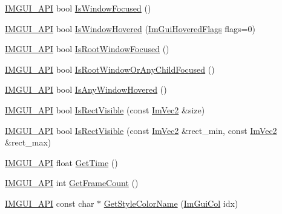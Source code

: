 \begin{DoxyCompactItemize}
\item 
\mbox{\hyperlink{imgui_8h_a43829975e84e45d1149597467a14bbf5}{I\+M\+G\+U\+I\+\_\+\+A\+PI}} bool \mbox{\hyperlink{namespace_im_gui_a1bc0d66039324e071c7d1ae20f9b1211}{Is\+Window\+Focused}} ()
\item 
\mbox{\hyperlink{imgui_8h_a43829975e84e45d1149597467a14bbf5}{I\+M\+G\+U\+I\+\_\+\+A\+PI}} bool \mbox{\hyperlink{namespace_im_gui_aaed1ebf40cc2cb2ec30b0ba39b91d4a5}{Is\+Window\+Hovered}} (\mbox{\hyperlink{imgui_8h_a3a8f688665e5ea0bd9700e1251580a2c}{Im\+Gui\+Hovered\+Flags}} flags=0)
\item 
\mbox{\hyperlink{imgui_8h_a43829975e84e45d1149597467a14bbf5}{I\+M\+G\+U\+I\+\_\+\+A\+PI}} bool \mbox{\hyperlink{namespace_im_gui_abf8f15c7648d453142b0dc72bc5ed8ba}{Is\+Root\+Window\+Focused}} ()
\item 
\mbox{\hyperlink{imgui_8h_a43829975e84e45d1149597467a14bbf5}{I\+M\+G\+U\+I\+\_\+\+A\+PI}} bool \mbox{\hyperlink{namespace_im_gui_ad7175b87a80da527fb5ba5bc75993091}{Is\+Root\+Window\+Or\+Any\+Child\+Focused}} ()
\item 
\mbox{\hyperlink{imgui_8h_a43829975e84e45d1149597467a14bbf5}{I\+M\+G\+U\+I\+\_\+\+A\+PI}} bool \mbox{\hyperlink{namespace_im_gui_a62379e94283e247288c9a6c15a2b797e}{Is\+Any\+Window\+Hovered}} ()
\item 
\mbox{\hyperlink{imgui_8h_a43829975e84e45d1149597467a14bbf5}{I\+M\+G\+U\+I\+\_\+\+A\+PI}} bool \mbox{\hyperlink{namespace_im_gui_a578ead6237b3ed05497ed361f18d9f97}{Is\+Rect\+Visible}} (const \mbox{\hyperlink{struct_im_vec2}{Im\+Vec2}} \&size)
\item 
\mbox{\hyperlink{imgui_8h_a43829975e84e45d1149597467a14bbf5}{I\+M\+G\+U\+I\+\_\+\+A\+PI}} bool \mbox{\hyperlink{namespace_im_gui_a5aca7e6939e07caaca489aa8c776fd81}{Is\+Rect\+Visible}} (const \mbox{\hyperlink{struct_im_vec2}{Im\+Vec2}} \&rect\+\_\+min, const \mbox{\hyperlink{struct_im_vec2}{Im\+Vec2}} \&rect\+\_\+max)
\item 
\mbox{\hyperlink{imgui_8h_a43829975e84e45d1149597467a14bbf5}{I\+M\+G\+U\+I\+\_\+\+A\+PI}} float \mbox{\hyperlink{namespace_im_gui_ab8d8a7a9e1a0e84e636202ec74733db9}{Get\+Time}} ()
\item 
\mbox{\hyperlink{imgui_8h_a43829975e84e45d1149597467a14bbf5}{I\+M\+G\+U\+I\+\_\+\+A\+PI}} int \mbox{\hyperlink{namespace_im_gui_a0180211f23fc10807dfc3d2f6e8681f9}{Get\+Frame\+Count}} ()
\item 
\mbox{\hyperlink{imgui_8h_a43829975e84e45d1149597467a14bbf5}{I\+M\+G\+U\+I\+\_\+\+A\+PI}} const char $\ast$ \mbox{\hyperlink{namespace_im_gui_a265d7614c4c0b92ba6dd43946a3293e0}{Get\+Style\+Color\+Name}} (\mbox{\hyperlink{imgui_8h_a1b0467ec582e731ae6292fef726fb5fe}{Im\+Gui\+Col}} idx)

\end{DoxyCompactItemize}
